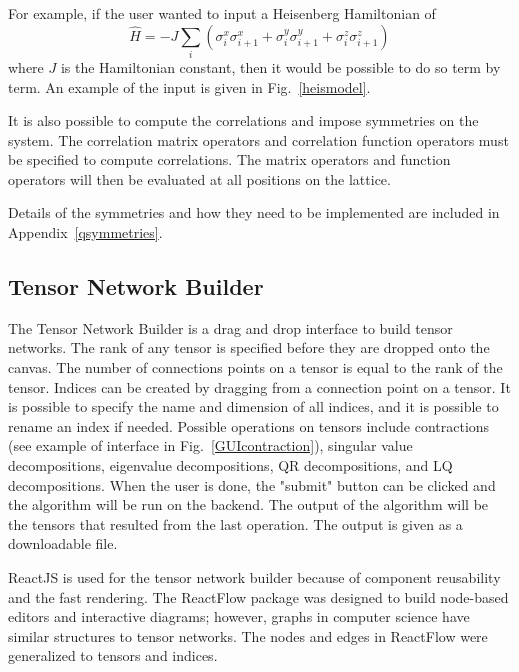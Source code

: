 \documentclass{juliacon}
\begin{document}
For example, if the user wanted to input a Heisenberg Hamiltonian of 
\begin{equation}\label{heisMPO}
\hat H = -J\sum_{i} \left( \sigma^x_i \sigma^x_{i+1} + \sigma^y_i \sigma^y_{i+1} + \sigma^z_i \sigma^z_{i+1}\right)
\end{equation}
where $J$ is the Hamiltonian constant, then it would be possible to do so term by term. An example of the input is given in Fig.~\ref{heismodel}.

It is also possible to compute the correlations and impose symmetries on the system. The correlation matrix operators and correlation function operators must be specified to compute correlations. The matrix operators and function operators will then be evaluated at all positions on the lattice. 

Details of the symmetries and how they need to be implemented are included in Appendix~\ref{qsymmetries}.




\subsection{Tensor Network Builder}

The Tensor Network Builder is a drag and drop interface to build tensor networks. The rank of any tensor is specified before they are dropped onto the canvas. The number of connections points on a tensor is equal to the rank of the tensor. Indices can be created by dragging from a connection point on a tensor. It is possible to specify the name and dimension of all indices, and it is possible to rename an index if needed. Possible operations on tensors include contractions (see example of interface in Fig.~\ref{GUIcontraction}), singular value decompositions, eigenvalue decompositions, QR decompositions, and LQ decompositions. When the user is done, the "submit" button can be clicked and the algorithm will be run on the backend. The output of the algorithm will be the tensors that resulted from the last operation. The output is given as a downloadable file.

ReactJS is used for the tensor network builder because of component reusability and the fast rendering. The ReactFlow package was designed to build node-based editors and interactive diagrams; however, graphs in computer science have similar structures to tensor networks. The nodes and edges in ReactFlow were generalized to tensors and indices. 
\end{document}
